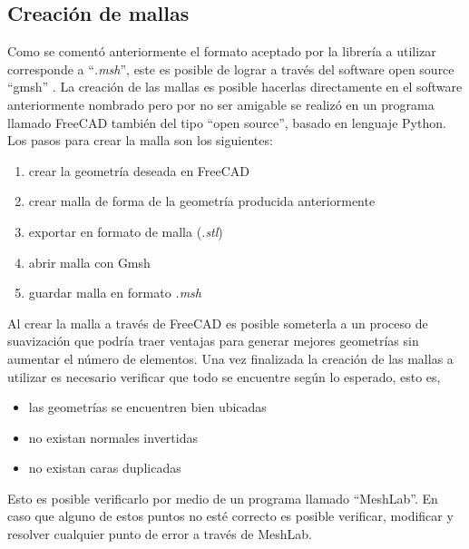 \documentclass[12pt,letterpaper]{article}
\numberwithin{equation}{section}
\begin{document}
\subsection{Creación de mallas}
Como se comentó anteriormente el formato aceptado por la librería a utilizar corresponde a ``\textit{.msh}'', este es posible de lograr a través del software open source ``gmsh'' \cite{paginaGmsh}. La creación de las mallas es posible hacerlas directamente en el software anteriormente nombrado pero por no ser amigable se realizó en un programa llamado FreeCAD también del tipo ``open source'', basado en lenguaje Python. Los pasos para crear la malla son los siguientes:

\begin{enumerate}
	\item crear la geometría deseada en FreeCAD
	\item crear malla de forma de la geometría producida anteriormente
	\item exportar en formato de malla (\textit{.stl})
	\item abrir malla con Gmsh
	\item guardar malla en formato \textit{.msh}
\end{enumerate}

Al crear la malla a través de FreeCAD es posible someterla a un proceso de suavización que podría traer ventajas para generar mejores geometrías sin aumentar el número de elementos. Una vez finalizada la creación de las mallas a utilizar es necesario verificar que todo se encuentre según lo esperado, esto es,

\begin{itemize}
	\item las geometrías se encuentren bien ubicadas
	\item no existan normales invertidas
	\item no existan caras duplicadas
\end{itemize}

Esto es posible verificarlo por medio de un programa llamado ``MeshLab''. En caso que alguno de estos puntos no esté correcto es posible verificar, modificar y resolver cualquier punto de error a través de MeshLab.
\end{document}
